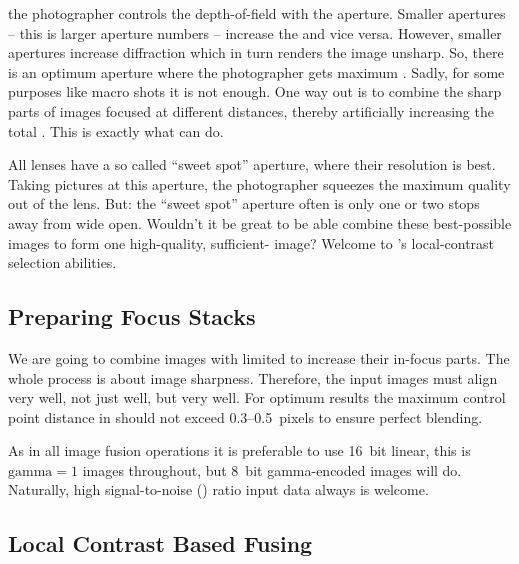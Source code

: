 %
\noindent the photographer controls the depth-of-field with the aperture.  Smaller apertures --
this is larger aperture numbers -- increase the  and vice versa.  However, smaller
apertures increase diffraction which in turn renders the image unsharp.  So, there is an optimum
aperture where the photographer gets maximum .  Sadly, for some purposes like macro
shots it is not enough.  One way out is to combine the sharp parts of images focused at
different distances, thereby artificially increasing the total .  This is exactly
what \App{} can do.

%
%
All lenses have a so called ``sweet spot'' aperture, where their resolution is best.  Taking
pictures at this aperture, the photographer squeezes the maximum quality out of the lens.  But:
the ``sweet spot'' aperture often is only one or two stops away from wide open.  Wouldn't it be
great to be able combine these best-possible images to form one high-quality,
sufficient- image?  Welcome to \App{}'s local-contrast selection abilities.


\subsection[Preparing Focus Stacks]{\label{sec:preparing-focus-stacks}%
  Preparing Focus Stacks}

We are going to combine images with limited  to increase their in-focus parts.  The
whole process is about image sharpness.  Therefore, the input images must align very well, not
just well, but very well.  For optimum results the maximum control point distance in
 should not exceed 0.3--0.5~pixels to ensure perfect blending.

%
%
As in all image fusion operations it is preferable to use 16~bit linear, this is $\mathrm{gamma}
= 1$ images throughout, but 8~bit gamma-encoded images will do.  Naturally, high signal-to-noise
() ratio input data always is welcome.


\subsection[Local Contrast Based Fusing]{\label{sec:local-contrast-based-fusing}%
  Local Contrast Based Fusing}

